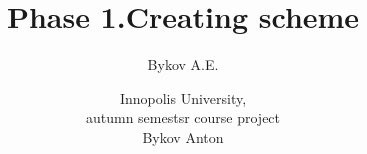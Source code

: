 \documentclass[12pt,a4paper]{article}
\author{Bykov A.E.}
\begin{document}
\newcommand{\happysmile}[1]{
\begin{tikzpicture}[scale=#1/10]
  \fill[yellow] (0,0) circle (2);
  \draw (0.75,0.5) circle (0.25);
  \draw (-0.75,0.5) circle (0.25);
  \draw (1,-0.5)..controls(0,-1.5)..(-1,-0.5);
\end{tikzpicture}
}
\newcommand{\sadsmile}[1]{
\begin{tikzpicture}[scale=#1/10]
  \fill[yellow] (0,0) circle (2);
  \draw (0.75,0.5) circle (0.25);
  \draw (-0.75,0.5) circle (0.25);
  \draw (1,-1)..controls(0,-0.5)..(-1,-1);
\end{tikzpicture}
}

\newcommand{\newtitle}[2]{
\title{#1}
\author{#2}
\maketitle
\tableofcontents
\pagebreak
}
\newcommand{\definition}[2]{
\underline{\textit{#1}}- #2
}
\newcommand{\code}[2]{

}
\newtitle{Phase 1.Creating scheme}{Innopolis University,\\ autumn semestsr course project\\ Bykov Anton}
\end{document}

